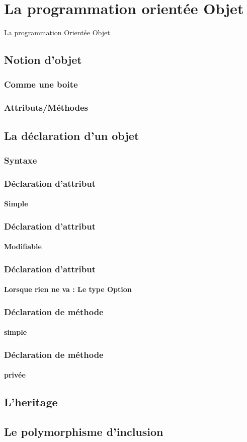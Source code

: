 \section{La programmation orientée Objet}
\begin{frame}
	\huge
	La programmation Orientée Objet
\end{frame}

\subsection{Notion d'objet} %
\begin{frame}
	\frametitle{Comme une boite}
	
\end{frame}
\begin{frame}
	\frametitle{Attributs/Méthodes}
	
\end{frame}

\subsection{La déclaration d'un objet} %
\begin{frame}
	\frametitle{Syntaxe}
	
\end{frame}

\begin{frame}
	\frametitle{Déclaration d'attribut}
	\framesubtitle{Simple}
	
\end{frame}

\begin{frame}
	\frametitle{Déclaration d'attribut}
	\framesubtitle{Modifiable}
	
\end{frame}

\begin{frame}
	\frametitle{Déclaration d'attribut}
	\framesubtitle{Lorsque rien ne va : Le type Option}
	
\end{frame}

\begin{frame}
	\frametitle{Déclaration de méthode}
	\framesubtitle{simple}
	
\end{frame}

\begin{frame}
	\frametitle{Déclaration de méthode}
	\framesubtitle{privée}
	
\end{frame}


\subsection{L'heritage} %
\begin{frame}

\end{frame}

\subsection{Le polymorphisme d'inclusion} %
\begin{frame}

\end{frame}
